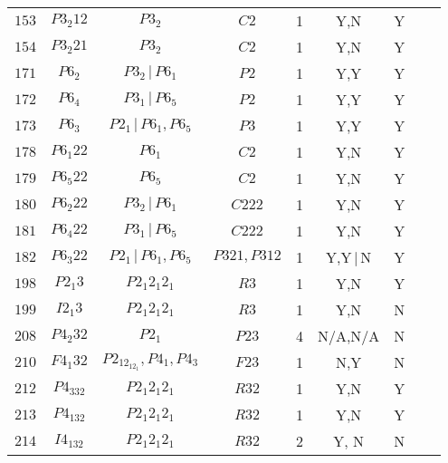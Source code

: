 \documentclass[12pt]{amsart}
\theoremstyle{definition}
\theoremstyle{remark}
\numberwithin{equation}{section}
\begin{document}
{\begin{tabular}{c*{7}{c}c}
$153$   & $P 3_2 1 2$       & $P 3_2$ & $C 2$ & 1 & Y,N  & Y \\
$154$   &  $P 3_2 2 1$      & $P 3_2$   & $C 2$ & 1 & Y,N & Y \\
$171$   & $P 6_2$   &   $P3_2\,\vert\, P6_1$  &  $P 2$  & 1 & Y,Y & Y \\
$172$   & $P 6_4$   & $P 3_1\,\vert\, P6_5$  &  $P 2$ & 1 & Y,Y & Y \\
$173$   & $P 6_3$         & $P 2_1\,\vert\, P6_1,P6_5$   &  $P 3$ & 1 & Y,Y & Y \\
$178$   & $P 6_1 2 2 $      & $P 6_1$  & $C 2$ & 1 & Y,N & Y \\
$179$   & $ P6_5 2 2 $      & $P 6_5$   & $C 2$ & 1 & Y,N & Y \\
$180 $  & $P 6_2 2 2$          & $P 3_2\,\vert\, P6_1$   & $C 222$ & 1 & Y,N & Y \\
$181$   & $P 6_4 2 2$      & $P 3_1\,\vert\, P6_5$  & $C 222$ & 1 & Y,N & Y \\
$182$   & $P 6_3 2 2$     & $P 2_1\,\vert\, P6_1,P6_5$  & $P 3 2 1, { P312} $ & 1 & Y,Y$\,\vert\,$N & Y \\
$198$   & $P 2_1 3$     & $P 2_1 2_1 2_1$  & $R 3$  & 1 & Y,N & Y \\
$199 $  & $I 2_1 3$      & $P 2_1 2_1 2_1$ &  $R 3 $ & 1 & Y,N & N \\
$208$ & $P 4_2 3 2 $ & ${P 2_1} $ & $P 2 3 $ & 4 & { N/A,N/A}  & { N} \\
$210$  & $F 4_1 3 2$       & { $P 2_12_12_1,P4_1,P4_3$}  & $F 2 3$ & 1 & N,Y  &  N \\
$212 $  & $P4_332$      & $P 2_1 2_1 2_1$ &  $R 32 $ & 1 & Y,N & Y \\
{ $213 $}  & $P4_132$      & $P 2_1 2_1 2_1$ &  $R 32 $ & 1 & Y,N & Y \\
{ $214$}  & $I4_132$      & $P 2_1 2_1 2_1$ &  $R 32 $ & 2 & Y,{ N}
& N \\
\end{tabular}
}
\\ \\
\end{document}
